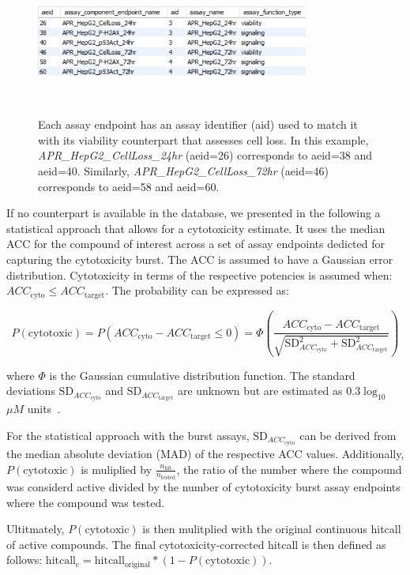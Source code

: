 \begin{figure} 
    \centering
    \includegraphics[width=0.8\textwidth]{figures/aeid_acid_aid.png}
    \caption{Each assay endpoint has an assay identifier (aid) used to match it with its viability counterpart that assesses cell loss. In this example, \emph{APR\_HepG2\_CellLoss\_24hr} (aeid=26) corresponds to aeid=38 and aeid=40. Similarly, \emph{APR\_HepG2\_CellLoss\_72hr} (aeid=46) corresponds to aeid=58 and aeid=60.}
~\label{fig:aeid_acid_aid}
\end{figure}

If no counterpart is available in the database, we presented in the following a statistical approach that allows for a cytotoxicity estimate. It uses the median ACC for the compound of interest across a set of assay endpoints dedicted for capturing the cytotoxicity burst. 
The ACC is assumed to have a Gaussian error distribution. Cytotoxicity in terms of the respective potencies is assumed when: $ACC_{\text{cyto}} \leq ACC_{\text{target}}$. The probability can be expressed as:

\[
P(\text{cytotoxic}) = P(ACC_{\text{cyto}} - ACC_{\text{target}} \leq 0) = \Phi\left(\frac{ACC_{\text{cyto}} - ACC_{\text{target}}}{\sqrt{\text{SD}_{ACC_{\text{cyto}}}^2 + \text{SD}_{ACC_{\text{target}}}^2 }}\right)
\]
    
where $\Phi$ is the Gaussian cumulative distribution function. The standard deviations $\text{SD}_{ACC_{\text{cyto}}}$ and $\text{SD}_{ACC_{\text{target}}}$ are unknown but are estimated as $0.3 \log_{10}$ ${\mu M}$ units~\cite{watt2018}. 

For the statistical approach with the burst assays, $\text{SD}_{ACC_{\text{cyto}}}$ can be derived from the median absolute deviation (MAD) of the respective ACC values. Additionally, $P(\text{cytotoxic})$ is muliplied by $\frac{n_{\text{hit}}}{n_{\text{tested}}}$, the ratio of the number where the compound was considerd active divided by the number of cytotoxicity burst assay endpoints where the compound was tested. 

Ultitmately, $P(\text{cytotoxic})$ is then mulitplied with the original continuous hitcall of active compounds. The final cytotoxicity-corrected hitcall is then defined as follows: $\text{hitcall}_{\text{c}} = \text{hitcall}_{\text{original}} * (1 - P(\text{cytotoxic}))$.


